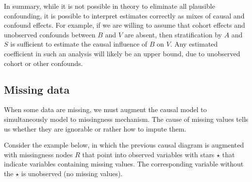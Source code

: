 \documentclass[reqno ,11pt]{amsart}
\begin{document}
In summary, while it is not possible in theory to eliminate all plausible confounding, it is possible to interpret estimates correctly as mixes of causal and confound effects. For example, if we are willing to assume that cohort effects and unobserved confounds between $B$ and $V$ are absent, then stratification by $A$ and $S$ is sufficient to estimate the causal influence of $B$ on $V$. Any estimated coefficient in such an analysis will likely be an upper bound, due to unobserved cohort or other confounds.

\subsection{Missing data}

When some data are missing, we must augment the causal model to simultaneously model to missingness mechanism. The cause of missing values tells us whether they are ignorable or rather how to impute them.

Consider the example below, in which the previous causal diagram is augmented with missingness nodes $R$ that point into observed variables with stars $\star$ that indicate variables containing missing values. The corresponding variable without the $\star$ is unobserved (no missing values). 

\begin{center}
  \end{center}
\end{document}
